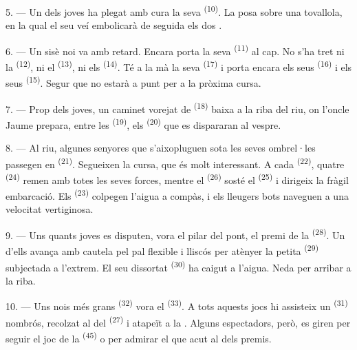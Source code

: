 5. --- Un dels joves ha plegat amb cura la seva  \textsuperscript{(10)}. La
posa sobre una tovallola, en la qual el seu veí embolicarà de seguida els dos
.

6. --- Un sisè noi va amb retard. Encara porta la seva  \textsuperscript{(11)}
al cap. No s'ha tret ni la  \textsuperscript{(12)}, ni el 
\textsuperscript{(13)}, ni els
 \textsuperscript{(14)}. Té a la mà la seva 
\textsuperscript{(17)} i porta encara els seus  \textsuperscript{(16)} i els
seus  \textsuperscript{(15)}. Segur que no estarà a punt per a la pròxima
cursa.

7. --- Prop dels joves, un caminet vorejat de  \textsuperscript{(18)} baixa a la
riba del riu, on l'oncle Jaume prepara, entre les  \textsuperscript{(19)}, els
 \textsuperscript{(20)} que es dispararan al vespre.

\VUsaut{4.4mm}
\VUsaut{3.4mm}

8. --- Al riu, algunes senyores que s'aixopluguen sota les seves ombrel·les passegen en
 \textsuperscript{(21)}. Segueixen la cursa, que és molt interessant. A cada
 \textsuperscript{(22)}, quatre
 \textsuperscript{(24)} remen amb totes les seves forces, mentre
el  \textsuperscript{(26)} sosté el  \textsuperscript{(25)} i
dirigeix la fràgil embarcació. Els  \textsuperscript{(23)} colpegen l'aigua a
compàs, i els lleugers bots naveguen a una velocitat vertiginosa.

9. --- Uns quants joves es disputen, vora el pilar del pont, el premi de la
 \textsuperscript{(28)}. Un d'ells avança amb cautela
pel pal flexible i lliscós per atènyer la petita  \textsuperscript{(29)}
subjectada a l'extrem. El seu dissortat
 \textsuperscript{(30)} ha caigut a l'aigua. Neda per arribar
a la riba.

10. --- Uns nois més grans  \textsuperscript{(32)} vora el
 \textsuperscript{(33)}. A tots aquests jocs hi assisteix un
 \textsuperscript{(31)} nombrós, recolzat al  del
 \textsuperscript{(27)} i atapeït a la . Alguns
espectadors, però, es giren per seguir el joc de la  \textsuperscript{(45)} o
per admirar el  que acut al
 dels premis.

